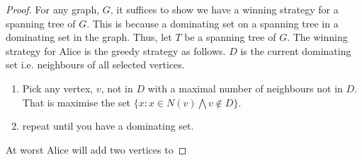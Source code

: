 \begin{proof}
    For any graph, $G$, it suffices to show we have a winning strategy for a spanning tree of $G$. This is because a dominating set on a spanning tree in a dominating set in the graph.
    Thus, let $T$ be a spanning tree of $G$.
    The winning strategy for Alice is the greedy strategy as follows. $D$ is the current dominating set i.e. neighbours of all selected vertices.
    \begin{enumerate}
        \item Pick any vertex, $v$, not in $D$ with a maximal number of neighbours not in $D$. That is maximise the set $\{x: x \in N(v) \bigwedge v \notin D\}$.
        \item repeat until you have a dominating set.
    \end{enumerate}

    At worst Alice will add two vertices to 
\end{proof}














